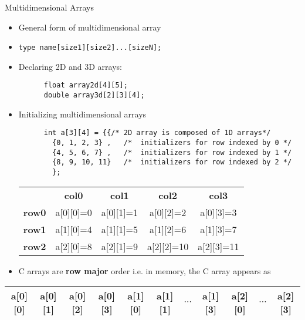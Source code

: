 \documentclass[10pt,t]{beamer}
\begin{document}
\begin{frame}[fragile]{Multidimensional Arrays}
  \begin{itemize}
  \item General form of multidimensional array
  \item[] \lstinline[basicstyle=\scriptsize\ttfamily]|type name[size1][size2]...[sizeN];|
  \item Declaring 2D and 3D arrays:
    \begin{lstlisting}
      float array2d[4][5];
      double array3d[2][3][4];
    \end{lstlisting}
  \item Initializing multidimensional arrays
    \begin{lstlisting}
      int a[3][4] = {{/* 2D array is composed of 1D arrays*/
        {0, 1, 2, 3} ,   /*  initializers for row indexed by 0 */
        {4, 5, 6, 7} ,   /*  initializers for row indexed by 1 */
        {8, 9, 10, 11}   /*  initializers for row indexed by 2 */
        };
    \end{lstlisting}
    \begin{center}
      \begin{tabular}{c|c|c|c|c|}
        \multicolumn{1}{c}{}& \multicolumn{1}{c}{\textbf{col0}} & \multicolumn{1}{c}{\textbf{col1}} & \multicolumn{1}{c}{\textbf{col2}} & \multicolumn{1}{c}{\textbf{col3}} \\
        \cline{2-5}
        \textbf{row0} & a[0][0]=0 & a[0][1]=1 & a[0][2]=2 & a[0][3]=3 \\
        \cline{2-5}
        \textbf{row1} & a[1][0]=4 & a[1][1]=5 & a[1][2]=6 & a[1][3]=7 \\
        \cline{2-5}
        \textbf{row2} & a[2][0]=8 & a[2][1]=9 & a[2][2]=10 & a[2][3]=11\\
        \cline{2-5}
      \end{tabular}
    \end{center}
  \item C arrays are \textbf{row major} order i.e. in memory, the C array appears as
  \end{itemize}
      {\scriptsize
        \begin{tabular}{|c|c|c|c|c|c|c|c|c|c|c|}
          \hline
          a[0][0] & a[0][1] & a[0][2] & a[0][3] & a[1][0] & a[1][1] & $\cdots$ & a[1][3] & a[2][0] & $\cdots$ & a[2][3]\\
          \hline
        \end{tabular}
      }
\end{frame}
\end{document}
